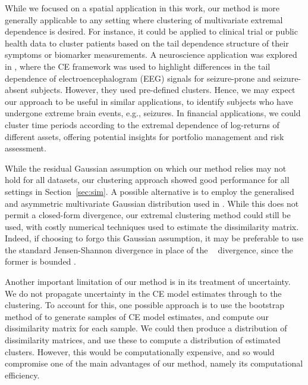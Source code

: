 \documentclass[12pt,compact]{article}
\newcommand{\JSGa}{\mathop{\mathrm{JS}^{\mathrm{G}_{\lambda}}}\nolimits}
\begin{document}
While we focused on a spatial application in this work, our method is more generally applicable to any setting where clustering of multivariate extremal dependence is desired.
For instance, it could be applied to clinical trial or public health data to cluster patients based on the tail dependence structure of their symptoms or biomarker measurements.
A neuroscience application was explored in \citet{Talento2025}, where the CE framework was used to highlight differences in the tail dependence of electroencephalogram (EEG) signals for seizure-prone and seizure-absent subjects. 
However, they used pre-defined clusters. Hence, we may expect our approach to be useful in similar applications, to identify subjects who have undergone extreme brain events, e.g., seizures.
In financial applications, we could cluster time periods according to the extremal dependence of log-returns of different assets, offering potential insights for portfolio management and risk assessment.

While the residual Gaussian assumption on which our method relies may not hold for all datasets, our clustering approach showed good performance for all settings in Section~\ref{sec:sim}.
A possible alternative is to employ the generalised and asymmetric multivariate Gaussian distribution used in \citet{Farrell2025}. 
While this does not permit a closed-form divergence, our extremal clustering method could still be used, with costly numerical techniques used to estimate the dissimilarity matrix.
Indeed, if choosing to forgo this Gaussian assumption, it may be preferable to use the standard Jensen-Shannon divergence in place of the $\JSGa{}$ divergence, since the former is bounded \citep{Thiagarajan2025}.

Another important limitation of our method is in its treatment of uncertainty.
We do not propagate uncertainty in the CE model estimates through to the clustering. 
To account for this, one possible approach is to use the bootstrap method of \citet{Heffernan2004} to generate samples of CE model estimates, and compute our dissimilarity matrix for each sample. 
We could then produce a distribution of dissimilarity matrices, and use these to compute a distribution of estimated clusters.
However, this would be computationally expensive, and so would compromise one of the main advantages of our method, namely its computational efficiency.
\end{document}
